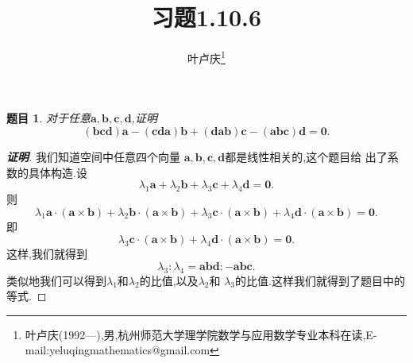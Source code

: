 \documentclass[a4paper]{article}
\newtheorem*{exe}{题目}
\newenvironment{exercise}
{\bigskip\begin{mdframed}\begin{exe}}
    {\end{exe}\end{mdframed}\bigskip}
\begin{document}
\title{\huge{\bf{习题1.10.6}}} \author{\small{叶卢庆\footnote{叶卢庆(1992---),男,杭州师范大学理学院数学与应用数学专业本科在读,E-mail:yeluqingmathematics@gmail.com}}}
\maketitle
\begin{exercise}
  对于任意$\mathbf{a},\mathbf{b},\mathbf{c},\mathbf{d}$,证明
$$
(\mathbf{bcd})\mathbf{a}-(\mathbf{cda})\mathbf{b}+(\mathbf{dab})\mathbf{c}-(\mathbf{abc})\mathbf{d}=\mathbf{0}.
$$
\end{exercise}
\begin{proof}[\textbf{证明}]
我们知道空间中任意四个向量
$\mathbf{a},\mathbf{b},\mathbf{c},\mathbf{d}$都是线性相关的,这个题目给
出了系数的具体构造.设
$$
\lambda_1\mathbf{a}+\lambda_2\mathbf{b}+\lambda_3\mathbf{c}+\lambda_4\mathbf{d}=\mathbf{0}.
$$
则
$$
\lambda_1\mathbf{a}\cdot (\mathbf{a}\times
\mathbf{b})+\lambda_2\mathbf{b}\cdot (\mathbf{a}\times
\mathbf{b})+\lambda_3\mathbf{c}\cdot (\mathbf{a}\times
\mathbf{b})+\lambda_4\mathbf{d}\cdot (\mathbf{a}\times \mathbf{b})=\mathbf{0}.
$$
即
$$
\lambda_3\mathbf{c}\cdot (\mathbf{a}\times
\mathbf{b})+\lambda_4\mathbf{d}\cdot (\mathbf{a}\times \mathbf{b})=\mathbf{0}.
$$
这样,我们就得到
$$
\lambda_3:\lambda_4=\mathbf{abd}:-\mathbf{abc}.
$$
类似地我们可以得到$\lambda_1$和$\lambda_2$的比值,以及$\lambda_2$和
$\lambda_3$的比值.这样我们就得到了题目中的等式.
\end{proof}
\end{document}
